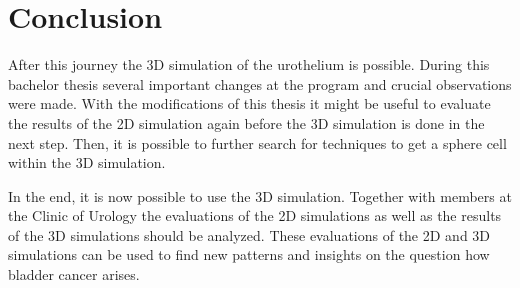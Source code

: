 \chapter{Conclusion}
After this journey the 3D simulation of the urothelium is possible. During this bachelor thesis several important changes at the program and crucial observations were made. \newline
With the modifications of this thesis it might be useful to evaluate the results of the 2D simulation again before the 3D simulation is done in the next step. Then, it is possible to further search for techniques to get a sphere cell within the 3D simulation.

In the end, it is now possible to use the 3D simulation. Together with members at the Clinic of Urology the evaluations of the 2D simulations as well as the results of the 3D simulations should be analyzed. These evaluations of the 2D and 3D simulations can be used to find new patterns and insights on the question how bladder cancer arises.